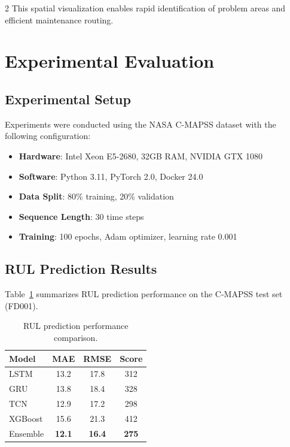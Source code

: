 \documentclass{ijceds} %
\begin{document}
\begin{multicols}{2}
This spatial visualization enables rapid identification of problem areas and efficient maintenance routing.


\section{Experimental Evaluation}
\label{sec:experimental-evaluation}

\subsection{Experimental Setup}

Experiments were conducted using the NASA C-MAPSS dataset with the following configuration:

\begin{itemize}
    \item \textbf{Hardware}: Intel Xeon E5-2680, 32GB RAM, NVIDIA GTX 1080
    \item \textbf{Software}: Python 3.11, PyTorch 2.0, Docker 24.0
    \item \textbf{Data Split}: 80\% training, 20\% validation
    \item \textbf{Sequence Length}: 30 time steps
    \item \textbf{Training}: 100 epochs, Adam optimizer, learning rate 0.001
\end{itemize}

\subsection{RUL Prediction Results}

Table~\ref{tab:rul-results} summarizes RUL prediction performance on the C-MAPSS test set (FD001).

\begin{table}[H]
\centering
\caption{RUL prediction performance comparison.}
\label{tab:rul-results}
\scriptsize
\begin{tabular}{|l|c|c|c|}
\hline
\textbf{Model} & \textbf{MAE} & \textbf{RMSE} & \textbf{Score} \\ \hline
LSTM & 13.2 & 17.8 & 312 \\ \hline
GRU & 13.8 & 18.4 & 328 \\ \hline
TCN & 12.9 & 17.2 & 298 \\ \hline
XGBoost & 15.6 & 21.3 & 412 \\ \hline
Ensemble & \textbf{12.1} & \textbf{16.4} & \textbf{275} \\ \hline
\end{tabular}
\end{table}


\end{multicols}
\end{document}
